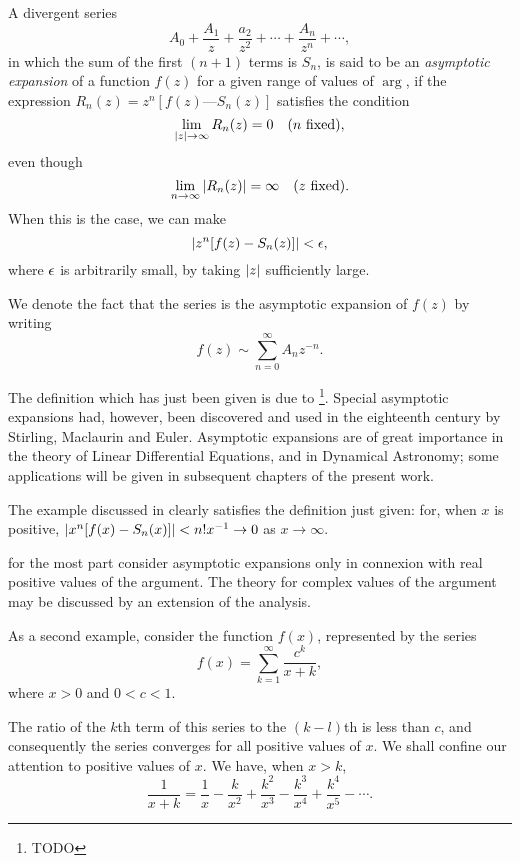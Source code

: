  A divergent series
$$
A_{0} + \frac{A_{1}}{z} + \frac{a_{2}}{z^{2}} + \cdots +
\frac{A_{n}}{z^{n}} + \cdots,
$$
in which the sum of the first $(n + 1)$ terms is $S_{n}$, is said to
be an \emph{asymptotic expansion} of a function $f(z)$ for a given
range of values of $\arg$, if the expression $R_{n}(z) = z^{n}[f(z) —
S_{n}(z)]$ satisfies the condition
$$
\lim_{ \left| z \right| \rightarrow \infty } R_{n}(z) = 0 \quad (\textrm{$n$
fixed}),
$$
even though
$$
\lim_{n \rightarrow \infty} \left| R_{n}(z) \right| = \infty \quad
(\textrm{$z$ fixed}).
$$
When this is the case, we can make
$$
\left|  z^{n} [f(z) - S_{n}(z)]  \right| < \epsilon,
$$
where $\epsilon$ is arbitrarily small, by taking $\left| z \right|$ sufficiently
large.

We denote the fact that the series is the asymptotic expansion of
$f(z)$ by writing
$$
f(z) \sim \sum_{n=0}^{\infty} A_{n} z^{-n}.
$$

The definition which has just been given is due to
\Poincare\footnote{TODO}. Special asymptotic expansions had, however,
been discovered and used in the eighteenth century by Stirling,
Maclaurin and Euler. Asymptotic expansions are of great importance in
the theory of Linear Differential Equations, and in Dynamical
Astronomy; some applications will be given in subsequent chapters of
the present work.

The example discussed in  clearly satisfies the
definition just given: for, when $x$ is positive, $\left| x^{n} [f(x)
- S_{n}(x)] \right| < n! x^{-1} \rightarrow 0$ as $x \rightarrow \infty$.

for the most part consider asymptotic expansions only in connexion
with real positive values of the argument. The theory for complex
values of the argument may be discussed by an extension of the
analysis.

 As a second
example, consider the function $f(x)$, represented by the series
$$
f(x) = \sum_{k=1}^{\infty} \frac{c^{k}}{x+k},
$$
where $x > 0$ and $0 < c < 1$.

% 
%

The ratio of the $k$th term of this series to the $(k- l)$th is less
than $c$, and consequently the series converges for all positive
values of $x$. We shall confine our attention to positive values of
$x$. We have, when $x > k$,
$$
\frac{1}{x+k} = \frac{1}{x} - \frac{k}{x^{2}} + \frac{k^{2}}{x^{3}} -
\frac{k^{3}}{x^{4}} + \frac{k^{4}}{x^{5}} - \cdots.
$$

